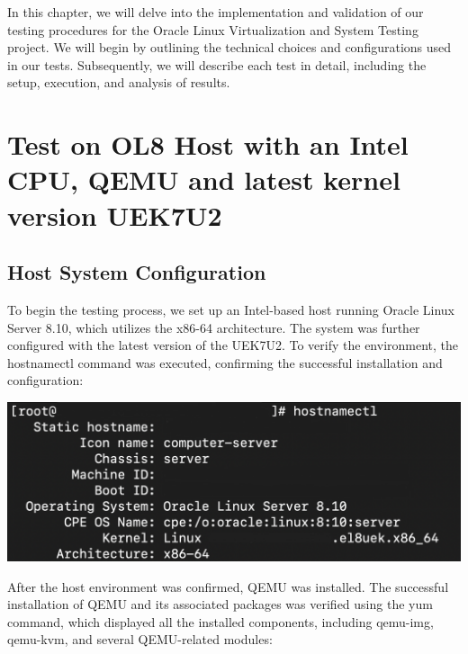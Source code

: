 In this chapter, we will delve into the implementation and validation of our testing procedures for the Oracle Linux Virtualization and System Testing project. We will begin by outlining the technical choices and configurations used in our tests. Subsequently, we will describe each test in detail, including the setup, execution, and analysis of results.

\newpage
{}
\hypertarget{fourthchapter}{}

\section{Test on OL8 Host with an Intel CPU, QEMU and latest kernel version UEK7U2}

\subsection{Host System Configuration}

To begin the testing process, we set up an Intel-based host running Oracle Linux Server 8.10, which utilizes the x86-64 architecture. The system was further configured with the latest version of the UEK7U2. To verify the environment, the hostnamectl command was executed, confirming the successful installation and configuration:

\begin{center}
    \centering
    \includegraphics[width=\textwidth]{Images/Hostnamectl Command on the Host.png}
    \label{fig:casa}
\end{center}

After the host environment was confirmed, QEMU was installed. The successful installation of QEMU and its associated packages was verified using the yum command, which displayed all the installed components, including qemu-img, qemu-kvm, and several QEMU-related modules:

